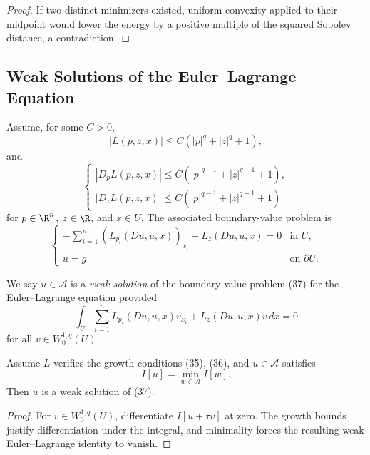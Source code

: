 \begin{proof}
\sketch If two distinct minimizers existed, uniform convexity applied to their midpoint would lower the energy by a positive multiple of the squared Sobolev distance, a contradiction.
\end{proof}

\subsection{Weak Solutions of the Euler--Lagrange Equation}
\label{sec:euler-lagrange-equation-weak-solutions}

Assume, for some $C>0$,
\[
|L(p,z,x)|\leq C(|p|^q+|z|^q+1),
\tag{35}
\]
and
\[
\begin{cases}
|D_pL(p,z,x)|\leq C(|p|^{q-1}+|z|^{q-1}+1),\\
|D_zL(p,z,x)|\leq C(|p|^{q-1}+|z|^{q-1}+1)
\end{cases}
\tag{36}
\]
for $p\in\R^n$, $z\in\R$, and $x\in U$. The associated boundary-value problem is
\[
\begin{cases}
-\displaystyle\sum_{i=1}^n(L_{p_i}(Du,u,x))_{x_i}+L_z(Du,u,x)=0 & \text{in }U,\\
u=g & \text{on }\partial U.
\end{cases}
\tag{37}
\]

\begin{definition}
\label{def:weak-solution-euler-lagrange-scalar}
We say $u \in \mathcal{A}$ is a \textit{weak solution} of the boundary-value problem (37) for the Euler--Lagrange equation provided
\[
\int_U \sum_{i=1}^n L_{p_i}(Du,u,x) v_{x_i} + L_z(Du,u,x) v \, dx = 0
\]
for all $v \in W_0^{1,q}(U)$.
\end{definition}

\begin{theorem}
\label{thm:weak-solution-euler-lagrange-scalar}
Assume $L$ verifies the growth conditions (35), (36), and $u \in \mathcal{A}$ satisfies
\[
I[u] = \min_{w \in \mathcal{A}} I[w].
\]
Then $u$ is a weak solution of (37).
\end{theorem}

\begin{proof}
\sketch For $v\in W_0^{1,q}(U)$, differentiate $I[u+\tau v]$ at zero. The growth bounds justify differentiation under the integral, and minimality forces the resulting weak Euler--Lagrange identity to vanish.
\end{proof}

